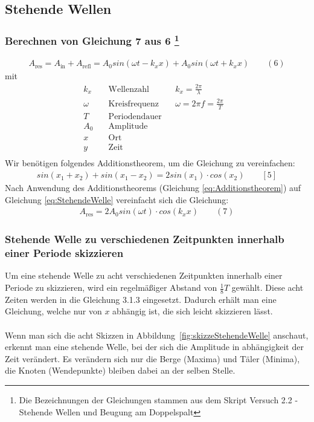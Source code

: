 \documentclass[a4paper]{scrartcl}
\numberwithin{equation}{subsection}
\begin{document}
\subsection{Stehende Wellen}
\subsubsection[Berechnen von Gleichung 7 aus 6]{Berechnen von Gleichung 7 aus 6 \footnote{Die Bezeichnungen der Gleichungen stammen aus dem Skript \glqq Versuch 2.2 - Stehende Wellen und Beugung am Doppelspalt\grqq}}

\begin{align}
\label{eq:StehendeWelle}
A_{\text{res}} = A_{\text{in}} + A_{\text{refl}} = A_0sin(\omega t-k_xx)+A_0sin(\omega t+k_xx)\qquad (6)
\end{align}
mit
\begin{align*}
k_x\quad &\text{Wellenzahl}&&k_x=\frac{2\pi}{\lambda}&\\
\omega \quad&\text{Kreisfrequenz}&&\omega=2\pi f=\frac{2\pi}{T}&\\
T\quad&\text{Periodendauer}&\\
A_{0}\quad&\text{Amplitude}&\\
x\quad&\text{Ort}&\\
y\quad&\text{Zeit}&\\
\end{align*}
Wir benötigen folgendes Additionstheorem, um die Gleichung zu vereinfachen:
\begin{align}
\label{eq:Additionstheorem}
sin(x_1+x_2)+sin(x_1-x_2)=2sin(x_1)\cdot cos(x_2)\qquad [5]
\end{align}
Nach Anwendung des Additionstheorems (Gleichung \ref{eq:Additionstheorem}) auf Gleichung \ref{eq:StehendeWelle} vereinfacht sich die Gleichung:
\begin{align}
A_{\text{res}}=2A_0sin(\omega t)\cdot cos(k_xx) \qquad (7)
\end{align}

\subsubsection{Stehende Welle zu verschiedenen Zeitpunkten innerhalb einer Periode skizzieren}
Um eine stehende Welle zu acht verschiedenen Zeitpunkten innerhalb einer Periode zu skizzieren, wird ein regelmäßiger Abstand von $\frac{1}{8}T$ gewählt. Diese acht Zeiten werden in die Gleichung 3.1.3 eingesetzt. Dadurch erhält man eine Gleichung, welche nur von $x$ abhängig ist, die sich leicht skizzieren lässt.\\\\
Wenn man sich die acht Skizzen in Abbildung~\ref{fig:skizzeStehendeWelle} anschaut, erkennt man eine stehende Welle, bei der sich die Amplitude in abhängigkeit der Zeit verändert. Es verändern sich nur die Berge (Maxima) und Täler (Minima), die Knoten (Wendepunkte) bleiben dabei an der selben Stelle.
\end{document}
